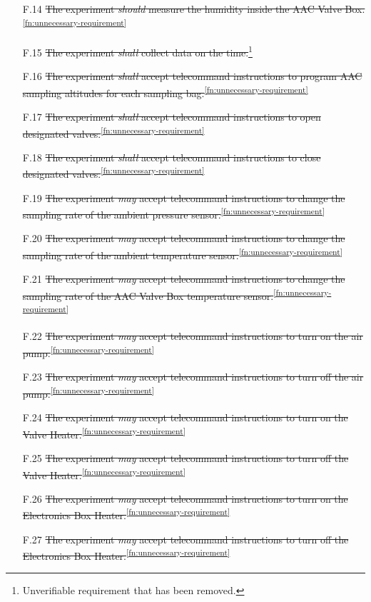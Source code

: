 \documentclass[a4paper,12pt,twoside]{article}
\begin{document}
\begin{appendices}
\begin{enumerate}
    \item[F.14] \st{The experiment \textit{should} measure the humidity inside the AAC Valve Box.}\textsuperscript{\ref{fn:unnecessary-requirement}}
    \item[F.15] \st{The experiment \textit{shall} collect data on the time.}\footnote{Unverifiable requirement that has been removed.\label{fn:unverifiable-requirement}}
    \item[F.16] \st{The experiment \textit{shall} accept telecommand instructions to program AAC sampling altitudes for each sampling bag.}\textsuperscript{\ref{fn:unnecessary-requirement}}
    \item[F.17] \st{The experiment \textit{shall} accept telecommand instructions to open designated valves.}\textsuperscript{\ref{fn:unnecessary-requirement}}
    \item[F.18] \st{The experiment \textit{shall} accept telecommand instructions to close designated valves.}\textsuperscript{\ref{fn:unnecessary-requirement}}
    \item[F.19] \st{The experiment \textit{may} accept telecommand instructions to change the sampling rate of the ambient pressure sensor.}\textsuperscript{\ref{fn:unnecessary-requirement}}
    \item[F.20] \st{The experiment \textit{may} accept telecommand instructions to change the sampling rate of the ambient temperature sensor.}\textsuperscript{\ref{fn:unnecessary-requirement}}
    \item[F.21] \st{The experiment \textit{may} accept telecommand instructions to change the sampling rate of the AAC Valve Box temperature sensor.}\textsuperscript{\ref{fn:unnecessary-requirement}}
    \item[F.22] \st{The experiment \textit{may} accept telecommand instructions to turn on the air pump.}\textsuperscript{\ref{fn:unnecessary-requirement}}
    \item[F.23] \st{The experiment \textit{may} accept telecommand instructions to turn off the air pump.}\textsuperscript{\ref{fn:unnecessary-requirement}}
    \item[F.24] \st{The experiment \textit{may} accept telecommand instructions to turn on the Valve Heater.}\textsuperscript{\ref{fn:unnecessary-requirement}}
    \item[F.25] \st{The experiment \textit{may} accept telecommand instructions to turn off the Valve Heater.}\textsuperscript{\ref{fn:unnecessary-requirement}}
    \item[F.26] \st{The experiment \textit{may} accept telecommand instructions to turn on the Electronics Box Heater.}\textsuperscript{\ref{fn:unnecessary-requirement}}
    \item[F.27] \st{The experiment \textit{may} accept telecommand instructions to turn off the Electronics Box Heater.}\textsuperscript{\ref{fn:unnecessary-requirement}}
\end{enumerate}


\end{appendices}
\end{document}
